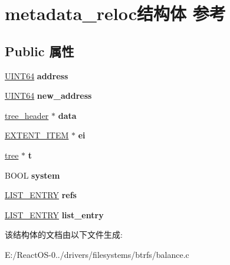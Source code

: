 \hypertarget{structmetadata__reloc}{}\section{metadata\+\_\+reloc结构体 参考}
\label{structmetadata__reloc}
\subsection*{Public 属性}
\begin{DoxyCompactItemize}
\item 
\mbox{\label{structmetadata__reloc_abade816a37319b20fa5126d71f7f4afb}} 
\hyperlink{_processor_bind_8h_a57be03562867144161c1bfee95ca8f7c}{U\+I\+N\+T64} {\bfseries address}
\item 
\mbox{\label{structmetadata__reloc_aa0d0f47138d2c06780b8178df819c871}} 
\hyperlink{_processor_bind_8h_a57be03562867144161c1bfee95ca8f7c}{U\+I\+N\+T64} {\bfseries new\+\_\+address}
\item 
\mbox{\label{structmetadata__reloc_af25a4d45fa18edfc2645cb32060e0215}} 
\hyperlink{structtree__header}{tree\+\_\+header} $\ast$ {\bfseries data}
\item 
\mbox{\label{structmetadata__reloc_a4991cb4cd850784b4e89478c050ae6ec}} 
\hyperlink{struct_e_x_t_e_n_t___i_t_e_m}{E\+X\+T\+E\+N\+T\+\_\+\+I\+T\+EM} $\ast$ {\bfseries ei}
\item 
\mbox{\label{structmetadata__reloc_a15e20ad4f169eae6bbd9dd12323e8079}} 
\hyperlink{struct__tree}{tree} $\ast$ {\bfseries t}
\item 
\mbox{\label{structmetadata__reloc_a04db097cebce7e815b6824b87df68789}} 
B\+O\+OL {\bfseries system}
\item 
\mbox{\label{structmetadata__reloc_a109d478c03409bddfac95c6b73139afa}} 
\hyperlink{struct___l_i_s_t___e_n_t_r_y}{L\+I\+S\+T\+\_\+\+E\+N\+T\+RY} {\bfseries refs}
\item 
\mbox{\label{structmetadata__reloc_aee2042e413b8157c5f99938476e1b865}} 
\hyperlink{struct___l_i_s_t___e_n_t_r_y}{L\+I\+S\+T\+\_\+\+E\+N\+T\+RY} {\bfseries list\+\_\+entry}
\end{DoxyCompactItemize}


该结构体的文档由以下文件生成\+:\begin{DoxyCompactItemize}
\item 
E\+:/\+React\+O\+S-\/0../drivers/filesystems/btrfs/balance.\+c\end{DoxyCompactItemize}
